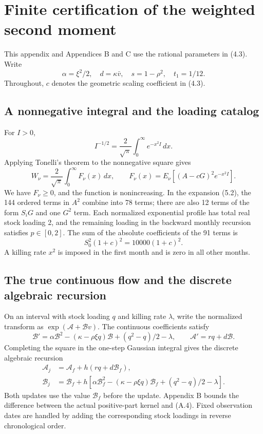 \documentclass[11pt,a4paper]{article}
\begin{document}
\appendix


\section{Finite certification of the weighted second moment}

This appendix and Appendices B and C use the rational parameters in (4.3). Write
\[
\alpha=\xi^2/2,\quad d=\kappa\bar v,\quad
s=1-\rho^2,\quad t_1=1/12.
\]
Throughout, \(c\) denotes the geometric scaling coefficient in (4.3).

\subsection{A nonnegative integral and the loading catalog}

For \(I>0\),
\[
I^{-1/2}=\frac2{\sqrt\pi}\int_0^\infty e^{-x^2I}\,dx.
\]
Applying Tonelli's theorem to the nonnegative square gives
\[
W_\nu=\frac2{\sqrt\pi}\int_0^\infty F_\nu(x)\,dx,\qquad
F_\nu(x)=E_\nu[(A-cG)^2e^{-x^2I}].
\tag{A.1}
\]
We have \(F_\nu\ge0\), and the function is nonincreasing. In the expansion (5.2), the 144 ordered terms in \(A^2\) combine into 78 terms; there are also 12 terms of the form \(S_iG\) and one \(G^2\) term. Each normalized exponential profile has total real stock loading 2, and the remaining loading in the backward monthly recursion satisfies \(p\in[0,2]\). The sum of the absolute coefficients of the 91 terms is
\[
S_0^2(1+c)^2=10000(1+c)^2.
\tag{A.2}
\]
A killing rate \(x^2\) is imposed in the first month and is zero in all other months.

\subsection{The true continuous flow and the discrete algebraic recursion}

On an interval with stock loading \(q\) and killing rate \(\lambda\), write the normalized transform as \(\exp(\mathcal A+\mathcal Bv)\). The continuous coefficients satisfy
\[
\mathcal B'=\alpha\mathcal B^2-(\kappa-\rho\xi q)\mathcal B+
(q^2-q)/2-\lambda,\qquad
\mathcal A'=rq+d\mathcal B.
\tag{A.3}
\]
Completing the square in the one-step Gaussian integral gives the discrete algebraic recursion
\[
\begin{aligned}
\mathcal A_j&=\mathcal A_f+h(rq+d\mathcal B_f),\\
\mathcal B_j&=\mathcal B_f+h\left[
\alpha\mathcal B_f^2-(\kappa-\rho\xi q)\mathcal B_f+
(q^2-q)/2-\lambda\right].
\end{aligned}
\tag{A.4}
\]
Both updates use the value \(\mathcal B_f\) before the update. Appendix B bounds the difference between the actual positive-part kernel and (A.4). Fixed observation dates are handled by adding the corresponding stock loadings in reverse chronological order.
\end{document}
